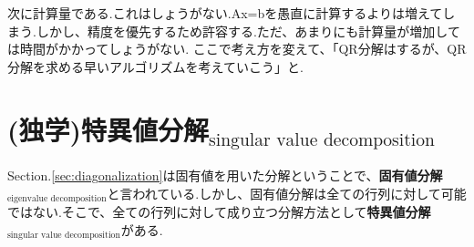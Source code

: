 次に計算量である.これはしょうがない.Ax=bを愚直に計算するよりは増えてしまう.しかし、精度を優先するため許容する.ただ、あまりにも計算量が増加しては時間がかかってしょうがない.
ここで考え方を変えて、「QR分解はするが、QR分解を求める早いアルゴリズムを考えていこう」と.
\section{(独学)特異値分解$_{\text{singular value decomposition}}$}
Section.\ref{sec:diagonalization}は固有値を用いた分解ということで、\textbf{固有値分解$_{\text{eigenvalue decomposition}}$}と言われている.しかし、固有値分解は全ての行列に対して可能ではない.そこで、全ての行列に対して成り立つ分解方法として\textbf{特異値分解$_{\text{singular value decomposition}}$}がある.\\